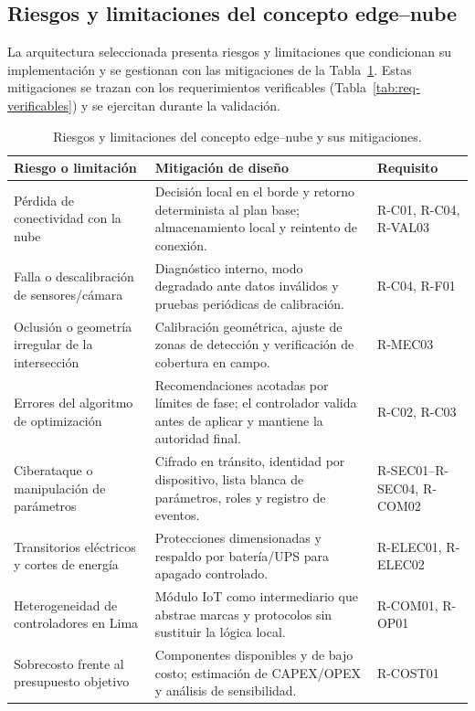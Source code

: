 \subsection{Riesgos y limitaciones del concepto edge--nube}\label{sec:riesgos-concepto}

La arquitectura seleccionada presenta riesgos y limitaciones que condicionan su implementación y se gestionan
con las mitigaciones de la Tabla~\ref{tab:riesgos-concepto}. Estas mitigaciones se trazan con los
requerimientos verificables (Tabla~\ref{tab:req-verificables}) y se ejercitan durante la validación.

\begin{table}[H]
  \centering
  \footnotesize
  \caption{Riesgos y limitaciones del concepto edge--nube y sus mitigaciones.}
  \label{tab:riesgos-concepto}
  \begin{tabularx}{\linewidth}{@{}>{\raggedright\arraybackslash}p{3.6cm}>{\raggedright\arraybackslash}X>{\raggedright\arraybackslash}p{2.0cm}@{}}
    \toprule
    \textbf{Riesgo o limitación} & \textbf{Mitigación de diseño} & \textbf{Requisito}\\
    \midrule
    Pérdida de conectividad con la nube & Decisión local en el borde y retorno determinista al plan base; almacenamiento local y reintento de conexión. & R-C01, R-C04, R-VAL03\\
    Falla o descalibración de sensores/cámara & Diagnóstico interno, modo degradado ante datos inválidos y pruebas periódicas de calibración. & R-C04, R-F01\\
    Oclusión o geometría irregular de la intersección & Calibración geométrica, ajuste de zonas de detección y verificación de cobertura en campo. & R-MEC03\\
    Errores del algoritmo de optimización & Recomendaciones acotadas por límites de fase; el controlador valida antes de aplicar y mantiene la autoridad final. & R-C02, R-C03\\
    Ciberataque o manipulación de parámetros & Cifrado en tránsito, identidad por dispositivo, lista blanca de parámetros, roles y registro de eventos. & R-SEC01--R-SEC04, R-COM02\\
    Transitorios eléctricos y cortes de energía & Protecciones dimensionadas y respaldo por batería/UPS para apagado controlado. & R-ELEC01, R-ELEC02\\
    Heterogeneidad de controladores en Lima & Módulo IoT como intermediario que abstrae marcas y protocolos sin sustituir la lógica local. & R-COM01, R-OP01\\
    Sobrecosto frente al presupuesto objetivo & Componentes disponibles y de bajo costo; estimación de CAPEX/OPEX y análisis de sensibilidad. & R-COST01\\
    \bottomrule
  \end{tabularx}
\end{table}

